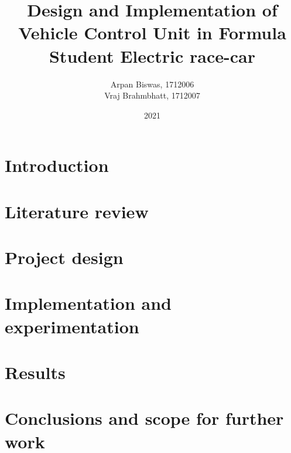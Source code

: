\documentclass[12pt]{report}
\title{
{Design and Implementation of Vehicle Control Unit in Formula Student Electric race-car}}
\author{Arpan Biswas, 1712006 \\ Vraj Brahmbhatt, 1712007}
\date{2021}
\newcommand\blankpage{%
    \null
    \thispagestyle{empty}%
    \addtocounter{page}{-1}%
    \newpage}
\begin{document}
\renewcommand{\thepage}{\roman{page}}















\setlength{\parskip}{0pt}
\tableofcontents
{}
\listoffigures
{}
\listoftables







\clearpage
\setcounter{page}{1}
\setcounter{chapter}{0}
\renewcommand{\thepage}{\arabic{page}}	

\setlength{\parskip}{1em}

\chapter{Introduction}\label{cha:introduction}


\chapter{Literature review\label{cha:litreivew}}\label{chap:lit}


\chapter{Project design\label{cha:design}}


\chapter{Implementation and experimentation\label{cha:implementation}}


\chapter{Results}


\chapter{Conclusions and scope for further work}


\printbibliography

\appendix



\end{document}

